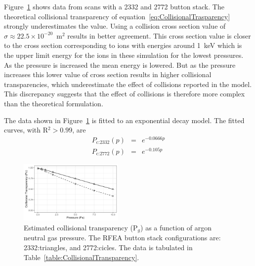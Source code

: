 Figure~\ref{fig:CollisionalTransparency} shows data from scans with a 2332 and 2772 button stack. The theoretical collisional transparency of equation~\ref{eq:CollisionalTrasparency} strongly underestimates the value. Using a collision cross section value of $\sigma \approx 22.5 \times 10^{-20}$~m$^2$ results in better agreement. This cross section value is closer to the cross section corresponding to ions with energies around 1~keV which is the upper limit energy for the ions in these simulation for the lowest pressures. As the pressure is increased the mean energy is lowered. But as the pressure increases this lower value of cross section results in higher collisional transparencies, which underestimate the effect of collisions reported in the model. This discrepancy suggests that the effect of collisions is therefore more complex than the theoretical formulation.  

The data shown in Figure~\ref{fig:CollisionalTransparency} is fitted to an exponential decay model. The fitted curves, with R$^2 > 0.99$, are
\begin{eqnarray}
P_\text{c:2332} (p) &=& e^{-0.0666 p} \\
P_\text{c:2772} (p) &=& e^{-0.105 p} 
\end{eqnarray}    

\begin{figure}[htbp]
\centering
\includegraphics[width=0.45\textwidth]{Figures/CollisionalTransparency.jpeg}
\caption{Estimated collisional transparency (P$_g$) as a function of argon neutral gas pressure. The RFEA button stack configurations are: 2332:triangles, and 2772:cicles. The data is tabulated in Table~\ref{table:CollisionalTransparency}.}
\label{fig:CollisionalTransparency}
\end{figure}



